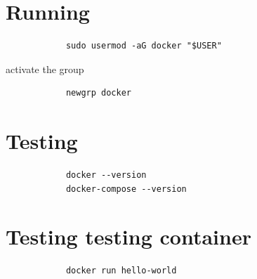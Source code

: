 \documentclass[a4paper]{article}
\begin{document}
    
    \section{Running}
        \begin{verbatim}
            sudo usermod -aG docker "$USER"
        \end{verbatim}
        activate the group
        \begin{verbatim}
            newgrp docker
        \end{verbatim}
    
    \section{Testing}
        \begin{verbatim}
            docker --version
            docker-compose --version
        \end{verbatim}
    
    \section{Testing testing container}
        \begin{verbatim}
            docker run hello-world
        \end{verbatim}

%        
%        
\end{document}
